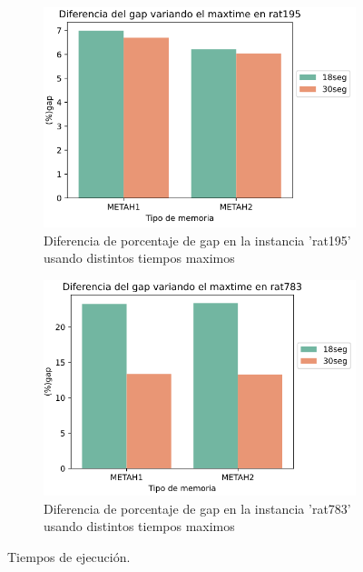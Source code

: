 \documentclass[10pt,a4paper]{article}
\begin{document}
\begin{figure}[h!]
    \centering
    \begin{subfigure}{0.45\linewidth}
        \centering
        \includegraphics[scale=0.30]{Graphs-punto5/punto5-rat195.png}
        \caption{Diferencia de porcentaje de gap en la instancia 'rat195' usando distintos tiempos maximos}
        \label{fig:exp_dif_gap_rat195}
    \end{subfigure}
    \begin{subfigure}{0.45\linewidth}
        \centering
        \includegraphics[scale=0.29]{Graphs-punto5/punto5-rat783.png}
        \caption{Diferencia de porcentaje de gap en la instancia 'rat783' usando distintos tiempos maximos}
        \label{fig:exp_dif_gap_rat783}
    \end{subfigure}
    \caption{Tiempos de ejecución.}
\end{figure}
\end{document}
